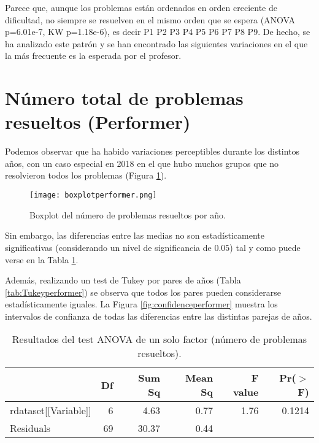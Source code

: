 Parece que, aunque los problemas están ordenados en orden creciente de dificultad, no siempre se resuelven en el mismo orden que se espera (ANOVA p=6.01e-7, KW p=1.18e-6), es decir P1 P2 P3 P4 P5 P6 P7 P8 P9. De hecho, se ha analizado este patrón y se han encontrado las siguientes variaciones en el que la más frecuente es la esperada por el profesor.

\section{Número total de problemas resueltos (Performer)}

Podemos observar que ha habido variaciones perceptibles durante los distintos años, con un caso especial en 2018 en el que hubo muchos grupos que no resolvieron todos los problemas (Figura \ref{fig:boxplotperformer}).

\begin{figure}[H]
    \centering
    \texttt{[image: boxplotperformer.png]}
    \caption{Boxplot del número de problemas resueltos por año.}
    \label{fig:boxplotperformer}
\end{figure}

Sin embargo, las diferencias entre las medias no son estadísticamente significativas (considerando un nivel de significancia de $0.05$) tal y como puede verse en la Tabla \ref{tab:ANOVAperformer}.

Además, realizando un test de Tukey por pares de años (Tabla \ref{tab:Tukeyperformer}) se observa que todos los pares pueden considerarse estadísticamente iguales. La Figura \ref{fig:confidenceperformer} muestra los intervalos de confianza de todas las diferencias entre las distintas parejas de años.

\begin{table}[H]
\centering
\caption{Resultados del test ANOVA de un solo factor (número de problemas resueltos).}
\label{tab:ANOVAperformer}
\begin{tabular}{lrrrrr}
  \hline
 & Df & Sum Sq & Mean Sq & F value & Pr($>$F) \\ 
  \hline
rdataset[[Variable]] & 6 & 4.63 & 0.77 & 1.76 & 0.1214 \\ 
  Residuals            & 69 & 30.37 & 0.44 &  &  \\ 
   \hline
\end{tabular}
\end{table}

